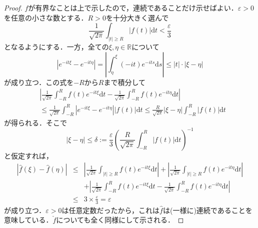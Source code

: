 \documentclass[a4j]{jsbook}
\numberwithin{theorem}{chapter}  %
\begin{document}
\begin{proof}
\(\hat{f}\)が有界なことは上で示したので，連続であることだけ示せばよい．\(\varepsilon>0\)を任意の小さな数とする．\(R>0\)を十分大きく選んで
\begin{equation*}
    \frac{1}{\sqrt{2\pi}}\int_{|t|\geq R}|f(t)|\mathrm{d}t<\frac{\varepsilon}{3}
\end{equation*}
となるようにする．一方，全ての\(\xi, \eta\in\mathbb{R}\)について
\begin{equation*}
    \left|e^{-it\xi}-e^{-it\eta}\right|=\left|\int_\eta^\xi (-it)e^{-its}\mathrm{d}s\right|\leq|t|\cdot|\xi-\eta|
\end{equation*}
が成り立つ．この式を\(-R\)から\(R\)まで積分して
\begin{align*}
&\left|\frac{1}{\sqrt{2\pi}}\int_{-R}^R f(t)e^{-it\xi}\mathrm{d}t-\frac{1}{\sqrt{2\pi}}\int_{-R}^R f(t)e^{-it\eta}\mathrm{d}t\right| \\
&\leq\frac{1}{\sqrt{2\pi}}\int_{-R}^R\left|e^{-it\xi}-e^{-it\eta}\right||f(t)|\mathrm{d}t\leq\frac{R}{\sqrt{2\pi}}|\xi-\eta|\int_{-R}^R|f(t)|\mathrm{d}t
\end{align*}
が得られる．そこで
\begin{equation*}
    |\xi-\eta|\leq\delta:=\frac{\varepsilon}{3}\left(\frac{R}{\sqrt{2\pi}}\int_{-R}^R|f(t)|\mathrm{d}t\right)^{-1}
\end{equation*}
と仮定すれば，
\begin{eqnarray*}
\left|\hat{f}(\xi)-\hat{f}(\eta)\right|&\leq&\left|\frac{1}{\sqrt{2\pi}}\int_{|t|\geq R}f(t)e^{-it\xi}\mathrm{d}t\right|+\left|\frac{1}{\sqrt{2\pi}}\int_{|t|\geq R}f(t)e^{-it\eta}\mathrm{d}t\right| \\
&\ &+\left|\frac{1}{\sqrt{2\pi}}\int_{-R}^R f(t)e^{-it\xi}\mathrm{d}t-\frac{1}{\sqrt{2\pi}}\int_{-R}^R f(t)e^{-it\eta}\mathrm{d}t\right| \\
&\leq&3\times\frac{\varepsilon}{3}=\varepsilon
\end{eqnarray*}
が成り立つ．\(\varepsilon>0\)は任意定数だったから，これは\(\hat{f}\)は(一様に)連続であることを意味している．\(\check{f}\)についても全く同様にして示される．
\end{proof}
\end{document}
